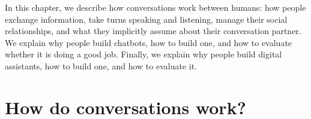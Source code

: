 In this chapter, we describe how  conversations work between humans: how people exchange information, take turns speaking and listening, manage their social relationships, and what they implicitly assume about their conversation partner.   We explain why people build chatbots, how to build one, and how to evaluate whether it is doing a good job. Finally,  we explain why people build digital assistants, how to build one, and how to evaluate it.





\section{How do conversations work?} \label{sec:convo}


